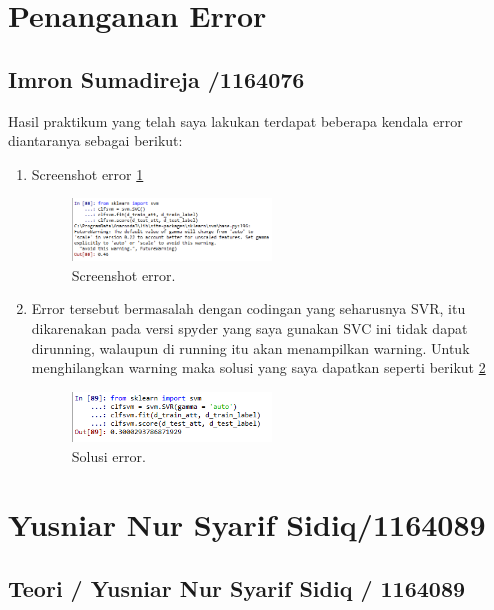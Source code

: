 \section{Penanganan Error}
\subsection{Imron Sumadireja /1164076}
Hasil praktikum yang telah saya lakukan terdapat beberapa kendala error diantaranya sebagai berikut: \par
\begin{enumerate}
\item Screenshot error \ref{ytError1}
		\begin{figure}[ht]
		\centerline{\includegraphics[width=0.5\textwidth]{figures/im/yterror1.png}}
		\caption{Screenshot error.}
		\label{ytError1}
		\end{figure}

\item Error tersebut bermasalah dengan codingan yang seharusnya SVR, itu dikarenakan pada versi spyder yang saya gunakan SVC ini tidak dapat dirunning, walaupun di running itu akan menampilkan warning. Untuk menghilangkan warning maka solusi yang saya dapatkan seperti berikut \ref{ytSolusi1}
		\begin{figure}[ht]
		\centerline{\includegraphics[width=0.5\textwidth]{figures/im/ytsolusi.png}}
		\caption{Solusi error.}
		\label{ytSolusi1}
		\end{figure}
\end{enumerate}

\section{Yusniar Nur Syarif Sidiq/1164089}
\subsection{Teori / Yusniar Nur Syarif Sidiq / 1164089}

